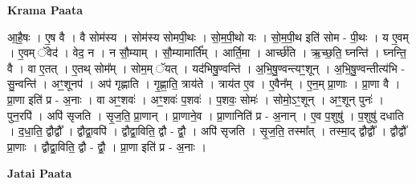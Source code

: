 \documentclass[17pt]{extarticle}
\begin{document}
\textbf{Krama Paata} \newline

आ॒है॒षः । ए॒ष वै । वै सोम॑स्य । सोम॑स्य सोमपी॒थः । सो॒म॒पी॒थो यः । सो॒म॒पी॒थ इति॑ सोम - पी॒थः । य ए॒वम् । ए॒वम् ॅवेद॑ । वेद॒ न । न सौ॒म्याम् । सौ॒म्यामार्ति᳚म् । आर्ति॒मा । आर्च्छ॑ति । ऋ॒च्छ॒ति॒ घ्नन्ति॑ । घ्नन्ति॒ वै । वा ए॒तत् । ए॒तथ् सोम᳚म् । सोम॒म् ॅयत् । यद॑भिषु॒ण्वन्ति॑ । अ॒भि॒षु॒ण्वन्त्यꣳ॒॒शून् । अ॒भि॒षु॒ण्वन्तीत्य॑भि - सु॒न्वन्ति॑ । अꣳ॒॒शूनप॑ । अप॑ गृह्णाति । गृ॒ह्णा॒ति॒ त्राय॑ते । त्राय॑त ए॒व । ए॒वैन᳚म् । ए॒न॒म् प्रा॒णाः । प्रा॒णा वै । प्रा॒णा इति॑ प्र - अ॒नाः । वा अꣳ॒॒शवः॑ । अꣳ॒॒शवः॑ प॒शवः॑ । प॒शवः॒ सोमः॑ । सोमो॒ऽꣳ॒शून् । अꣳ॒॒शून् पुनः॑ । पुन॒रपि॑ । अपि॑ सृजति । सृ॒ज॒ति॒ प्रा॒णान् । प्रा॒णाने॒व । प्रा॒णानिति॑ प्र - अ॒नान् । ए॒व प॒शुषु॑ । प॒शुषु॑ दधाति । द॒धा॒ति॒ द्वौद्वौ᳚ । द्वौद्वा॒वपि॑ । द्वौद्वा॒विति॒ द्वौ - द्वौ॒ । अपि॑ सृजति । सृ॒ज॒ति॒ तस्मा᳚त् । तस्मा॒द् द्वौद्वौ᳚ । द्वौद्वौ᳚ प्रा॒णाः । द्वौद्वा॒विति॒ द्वौ - द्वौ॒ । प्रा॒णा इति॑ प्र - अ॒नाः । \newline

\textbf{Jatai Paata} \newline
\end{document}
